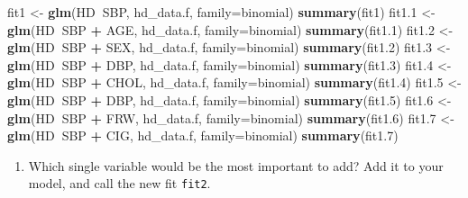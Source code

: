 \documentclass[]{article}
\newenvironment{Shaded}{\begin{snugshade}}{\end{snugshade}}
\newcommand{\KeywordTok}[1]{\textcolor[rgb]{0.13,0.29,0.53}{\textbf{#1}}}
\newcommand{\DataTypeTok}[1]{\textcolor[rgb]{0.13,0.29,0.53}{#1}}
\newcommand{\DecValTok}[1]{\textcolor[rgb]{0.00,0.00,0.81}{#1}}
\newcommand{\StringTok}[1]{\textcolor[rgb]{0.31,0.60,0.02}{#1}}
\newcommand{\OperatorTok}[1]{\textcolor[rgb]{0.81,0.36,0.00}{\textbf{#1}}}
\newcommand{\NormalTok}[1]{#1}
\providecommand{\tightlist}{%
  \setlength{\itemsep}{0pt}\setlength{\parskip}{0pt}}
\begin{document}
\begin{Shaded}
\begin{Highlighting}[]
\NormalTok{fit1 <-}\StringTok{ }\KeywordTok{glm}\NormalTok{(HD}\OperatorTok{~}\NormalTok{SBP, hd_data.f, }\DataTypeTok{family=}\NormalTok{binomial)}
\KeywordTok{summary}\NormalTok{(fit1)}
\NormalTok{fit1.}\DecValTok{1}\NormalTok{ <-}\StringTok{ }\KeywordTok{glm}\NormalTok{(HD}\OperatorTok{~}\NormalTok{SBP }\OperatorTok{+}\StringTok{ }\NormalTok{AGE, hd_data.f, }\DataTypeTok{family=}\NormalTok{binomial)}
\KeywordTok{summary}\NormalTok{(fit1.}\DecValTok{1}\NormalTok{)}
\NormalTok{fit1.}\DecValTok{2}\NormalTok{ <-}\StringTok{ }\KeywordTok{glm}\NormalTok{(HD}\OperatorTok{~}\NormalTok{SBP }\OperatorTok{+}\StringTok{ }\NormalTok{SEX, hd_data.f, }\DataTypeTok{family=}\NormalTok{binomial)}
\KeywordTok{summary}\NormalTok{(fit1.}\DecValTok{2}\NormalTok{)}
\NormalTok{fit1.}\DecValTok{3}\NormalTok{ <-}\StringTok{ }\KeywordTok{glm}\NormalTok{(HD}\OperatorTok{~}\NormalTok{SBP }\OperatorTok{+}\StringTok{ }\NormalTok{DBP, hd_data.f, }\DataTypeTok{family=}\NormalTok{binomial)}
\KeywordTok{summary}\NormalTok{(fit1.}\DecValTok{3}\NormalTok{)}
\NormalTok{fit1.}\DecValTok{4}\NormalTok{ <-}\StringTok{ }\KeywordTok{glm}\NormalTok{(HD}\OperatorTok{~}\NormalTok{SBP }\OperatorTok{+}\StringTok{ }\NormalTok{CHOL, hd_data.f, }\DataTypeTok{family=}\NormalTok{binomial)}
\KeywordTok{summary}\NormalTok{(fit1.}\DecValTok{4}\NormalTok{)}
\NormalTok{fit1.}\DecValTok{5}\NormalTok{ <-}\StringTok{ }\KeywordTok{glm}\NormalTok{(HD}\OperatorTok{~}\NormalTok{SBP }\OperatorTok{+}\StringTok{ }\NormalTok{DBP, hd_data.f, }\DataTypeTok{family=}\NormalTok{binomial)}
\KeywordTok{summary}\NormalTok{(fit1.}\DecValTok{5}\NormalTok{)}
\NormalTok{fit1.}\DecValTok{6}\NormalTok{ <-}\StringTok{ }\KeywordTok{glm}\NormalTok{(HD}\OperatorTok{~}\NormalTok{SBP }\OperatorTok{+}\StringTok{ }\NormalTok{FRW, hd_data.f, }\DataTypeTok{family=}\NormalTok{binomial)}
\KeywordTok{summary}\NormalTok{(fit1.}\DecValTok{6}\NormalTok{)}
\NormalTok{fit1.}\DecValTok{7}\NormalTok{ <-}\StringTok{ }\KeywordTok{glm}\NormalTok{(HD}\OperatorTok{~}\NormalTok{SBP }\OperatorTok{+}\StringTok{ }\NormalTok{CIG, hd_data.f, }\DataTypeTok{family=}\NormalTok{binomial)}
\KeywordTok{summary}\NormalTok{(fit1.}\DecValTok{7}\NormalTok{)}
\end{Highlighting}
\end{Shaded}

\begin{enumerate}
\def\labelenumi{\roman{enumi}.}
\tightlist
\item
  Which single variable would be the most important to add? Add it to
  your model, and call the new fit \texttt{fit2}.
\end{enumerate}
\end{document}
